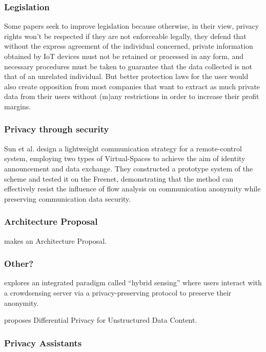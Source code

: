 \documentclass[conference]{IEEEtran}
\begin{document}
\subsubsection{Legislation}

Some papers seek to improve legislation \cite{WEBER2015618, FabianoInternet} because
otherwise, in their view, privacy rights won't be respected if they are not enforceable
legally, they defend that without the express agreement of the individual
concerned, private information obtained by IoT devices must not be retained
or processed in any form, and necessary procedures must be taken to guarantee
that the data collected is not that of an unrelated individual.
But better protection laws for the user would also create opposition from
most companies that want to extract as much private data from their
users without (m)any restrictions in order to increase their profit margins.

\subsubsection{Privacy through security}

Sun et al. \cite{SunSecure} design a lightweight communication strategy for a
remote-control system, employing two types of Virtual-Spaces to achieve the aim of
identity announcement and data exchange. They constructed a prototype system of the
scheme and tested it on the Freenet, demonstrating that the method can effectively
resist the influence of flow analysis on communication anonymity while preserving
communication data security.

\subsubsection{Architecture Proposal}

\cite{AntunesFederated} makes an Architecture Proposal.

\subsubsection{Other?}

\cite{ZhuIntegrating} explores an integrated paradigm called ``hybrid sensing''
where users interact with a crowdsensing server via a privacy-preserving protocol
to preserve their anonymity.

\cite{ZhaoSurvey} proposes Differential Privacy for Unstructured Data Content.

\subsubsection{Privacy Assistants}
\end{document}
